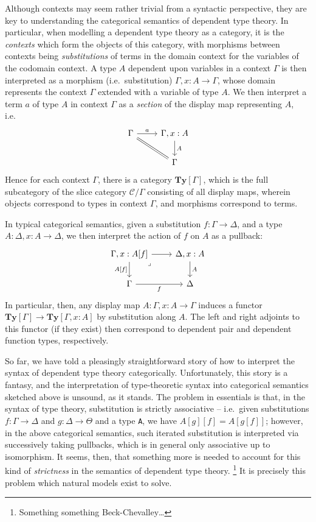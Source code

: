 \documentclass[
  11pt,
  oneside,
  article]{memoir}
\theoremstyle{definition}
\theoremstyle{plain}
\newcommand{\0}{\textsf{0}}
\newcommand{\1}{\tn{\textsf{1}}}
\begin{document}
Although contexts may seem rather trivial from a syntactic perspective,
they are key to understanding the categorical semantics of dependent
type theory. In particular, when modelling a dependent type theory as a
category, it is the \emph{contexts} which form the objects of this
category, with morphisms between contexts being \emph{substitutions} of
terms in the domain context for the variables of the codomain context. A
type \(A\) dependent upon variables in a context \(\Gamma\) is then
interpreted as a morphism (i.e.~substitution)
\(\Gamma, x : A \to \Gamma\), whose domain represents the context
\(\Gamma\) extended with a variable of type \(A\). We then interpret a
term \(a\) of type \(A\) in context \(\Gamma\) as a \emph{section} of
the display map representing \(A\), i.e.~\[
\begin{tikzcd}
    \Gamma & {\Gamma, x : A} \\
    & \Gamma
    \arrow["a", from=1-1, to=1-2]
    \arrow[Rightarrow, no head, from=1-1, to=2-2]
    \arrow["A", from=1-2, to=2-2]
\end{tikzcd}
\] Hence for each context \(\Gamma\), there is a category
\(\mathbf{Ty}[\Gamma]\), which is the full subcategory of the slice
category \(\mathcal{C}/\Gamma\) consisting of all display maps, wherein
objects correspond to types in context \(\Gamma\), and morphisms
correspond to terms.

In typical categorical semantics, given a substitution
\(f : \Gamma \to \Delta\), and a type \(A : \Delta, x : A \to \Delta\),
we then interpret the action of \(f\) on \(A\) as a pullback: \[
\begin{tikzcd}
    {\Gamma, x : A[f]} & {\Delta, x : A} \\
    \Gamma & \Delta
    \arrow[from=1-1, to=1-2]
    \arrow["{A[f]}"', from=1-1, to=2-1]
    \arrow["\lrcorner"{anchor=center, pos=0.125}, draw=none, from=1-1, to=2-2]
    \arrow["A", from=1-2, to=2-2]
    \arrow["f"', from=2-1, to=2-2]
\end{tikzcd}
\] In particular, then, any display map \(A : \Gamma, x : A \to \Gamma\)
induces a functor \(\mathbf{Ty}[\Gamma] \to \mathbf{Ty}[\Gamma, x : A]\)
by substitution along \(A\). The left and right adjoints to this functor
(if they exist) then correspond to dependent pair and dependent function
types, respectively.

So far, we have told a pleasingly straightforward story of how to
interpret the syntax of dependent type theory categorically.
Unfortunately, this story is a fantasy, and the interpretation of
type-theoretic syntax into categorical semantics sketched above is
unsound, as it stands. The problem in essentials is that, in the syntax
of type theory, substitution is strictly associative -- i.e.~given
substitutions \(f : \Gamma \to \Delta\) and \(g : \Delta \to \Theta\)
and a type \texttt{A}, we have \(A[g][f] = A[g[f]]\); however, in the
above categorical semantics, such iterated substitution is interpreted
via successively taking pullbacks, which is in general only associative
up to isomorphism. It seems, then, that something more is needed to
account for this kind of \emph{strictness} in the semantics of dependent
type theory. \footnote{Something something Beck-Chevalley\ldots{}} It is
precisely this problem which natural models exist to solve.
\end{document}
